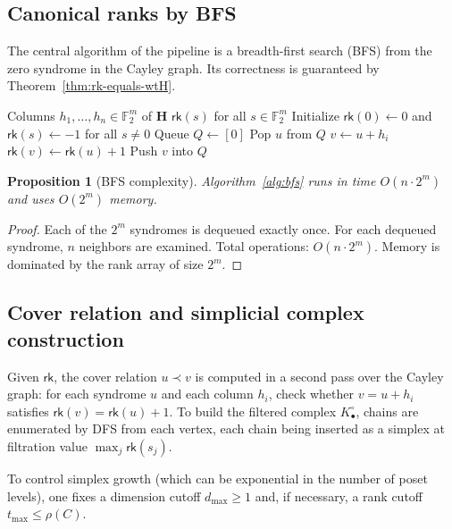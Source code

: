 \documentclass[11pt,twoside,leqno]{article}
\theoremstyle{definition}
\theoremstyle{plain}
\newtheorem{proposition}[definition]{Proposition}
\theoremstyle{remark}
\newcommand{\Ftwo}{\mathbb{F}_2}
\newcommand{\rk}{\mathsf{rk}}
\newcommand{\HH}{\mathbf{H}}
\newcommand{\covrad}{\rho}
\begin{document}
\subsection{Canonical ranks by BFS}

The central algorithm of the pipeline is a breadth-first search (BFS) from the zero syndrome in the
Cayley graph. Its correctness is guaranteed by Theorem~\ref{thm:rk-equals-wtH}.

\begin{algorithm}[h]
\caption{Canonical ranks by BFS in the syndrome Cayley graph}\label{alg:bfs}
\begin{algorithmic}[1]
\Require Columns $h_1,\dots,h_n\in\Ftwo^m$ of $\HH$
\Ensure $\rk(s)$ for all $s\in\Ftwo^m$
\State Initialize $\rk(0)\gets 0$ and $\rk(s)\gets -1$ for all $s\neq 0$
\State Queue $Q\gets [0]$
  \State Pop $u$ from $Q$
     \State $v\gets u+h_i$ \Comment{addition in $\Ftwo^m$}
     \If{$\rk(v)=-1$}
        \State $\rk(v)\gets \rk(u)+1$
        \State Push $v$ into $Q$
     \EndIf
  \EndFor
\EndWhile
\end{algorithmic}
\end{algorithm}

\begin{proposition}[BFS complexity]\label{prop:complexity}
Algorithm~\ref{alg:bfs} runs in time $O(n\cdot 2^m)$ and uses $O(2^m)$ memory.
\end{proposition}

\begin{proof}
Each of the $2^m$ syndromes is dequeued exactly once. For each dequeued syndrome, $n$ neighbors are
examined. Total operations: $O(n\cdot 2^m)$. Memory is dominated by the rank array of size $2^m$.
\end{proof}

\subsection{Cover relation and simplicial complex construction}

Given $\rk$, the cover relation $u\prec v$ is computed in a second pass over the Cayley graph:
for each syndrome $u$ and each column $h_i$, check whether $v=u+h_i$ satisfies $\rk(v)=\rk(u)+1$.
To build the filtered complex $K_\bullet^\circ$, chains are enumerated by DFS from each vertex,
each chain being inserted as a simplex at filtration value $\max_j\rk(s_j)$.

To control simplex growth (which can be exponential in the number of poset levels), one fixes
a dimension cutoff $d_{\max}\ge 1$ and, if necessary, a rank cutoff $t_{\max}\le\covrad(C)$.
\end{document}
